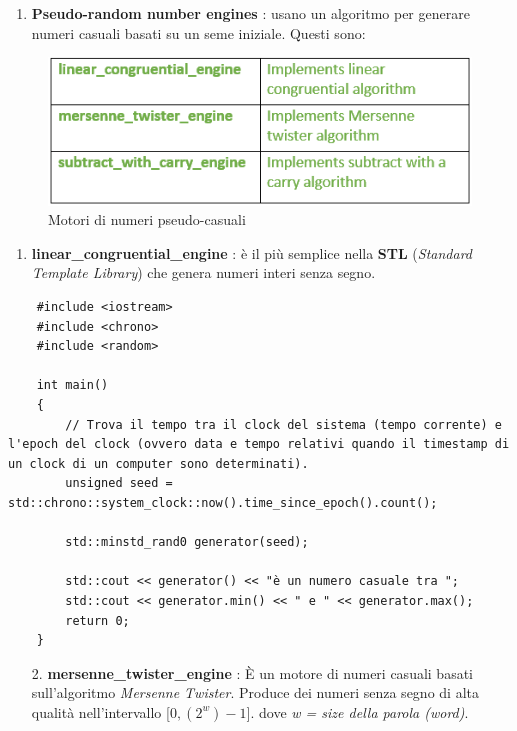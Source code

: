 \begin{enumerate}[I]
	\item \textsf{\small \textbf{Pseudo-random number engines} : usano un algoritmo per generare numeri casuali basati su un seme iniziale. Questi sono: }
\end{enumerate}

\begin{figure}[H]
	\centering
	\includegraphics[width=1\textwidth, height=1\textheight, keepaspectratio]{./imgs/random-number-engines.png}
	\caption{Motori di numeri pseudo-casuali}
	\label{fig:random-number-engines}
\end{figure}

\begin{enumerate}
	\item \textsf{\small \textbf{linear\_congruential\_engine} : è il più semplice nella \textbf{STL} (\emph{Standard Template Library}) che genera numeri interi senza segno.}
\end{enumerate}

\begin{lstlisting}
	#include <iostream>
	#include <chrono>
	#include <random>
	
	int main()
	{
		// Trova il tempo tra il clock del sistema (tempo corrente) e l'epoch del clock (ovvero data e tempo relativi quando il timestamp di un clock di un computer sono determinati).
		unsigned seed = std::chrono::system_clock::now().time_since_epoch().count();
		
		std::minstd_rand0 generator(seed);
		
		std::cout << generator() << "è un numero casuale tra ";
		std::cout << generator.min() << " e " << generator.max();
		return 0;
	}
\end{lstlisting}

\begin{enumerate}
	\item[2.] \textsf{\small \textbf{mersenne\_twister\_engine} : È un motore di numeri casuali basati sull'algoritmo \emph{Mersenne Twister}. Produce dei numeri senza segno di alta qualità nell'intervallo [$0, (2^w)-1]$. dove \emph{w = size della parola (word)}.} \\
\end{enumerate}

